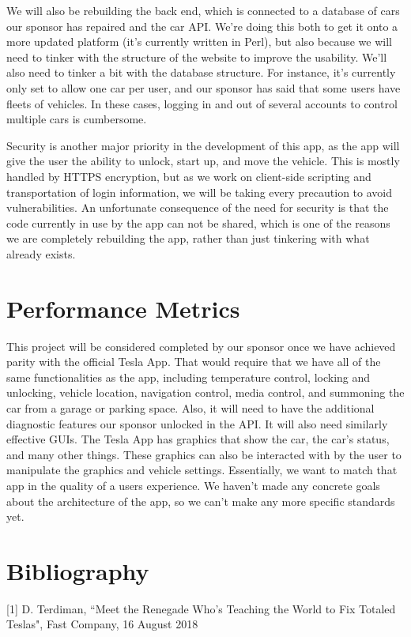 \documentclass[onecolumn, draftclsnofoot,10pt, compsoc]{IEEEtran}
\begin{document}
We will also be rebuilding the back end, which is connected to a database of cars our sponsor has repaired and the car API. We're doing 
this both to get it onto a more updated platform (it's currently written in Perl), but also because we will need to tinker with the structure of the website to improve 
the usability. We'll also need to tinker a bit with the database structure. For instance, it's currently only set to allow one car per user, and our sponsor has said
that some users have fleets of vehicles. In these cases, logging in and out of several accounts to control multiple cars is cumbersome.

Security is another major priority in the development of this app, as the app will give the user the ability to unlock, start up, and move the vehicle. 
This is mostly handled by HTTPS encryption, but as we work on client-side scripting and transportation of login information, we will be taking every 
precaution to avoid vulnerabilities. An unfortunate consequence of the need for security is that the code currently in use by the app can not be shared, which
is one of the reasons we are completely rebuilding the app, rather than just tinkering with what already exists.

\section{Performance Metrics}
This project will be considered completed by our sponsor once we have achieved parity with the official Tesla App. That would require that we have all of the same functionalities as the app, including 
temperature control, locking and unlocking, vehicle location, navigation control, media control, and summoning the car from a garage or parking space. Also, it will need 
to have the additional diagnostic features our sponsor unlocked in the API. It will also need similarly effective GUIs. The Tesla App has graphics that show the car, 
the car's status, and many other things. These graphics can also be interacted with by the user to manipulate the graphics and vehicle settings. Essentially, we want to 
match that app in the quality of a users experience. We haven't made any concrete goals about the architecture of the app, so we can't make any more specific standards 
yet.

\section{Bibliography}
[1] D. Terdiman, ``Meet the Renegade Who's Teaching the World to Fix Totaled Teslas", Fast Company, 16 August 2018
\end{document}
